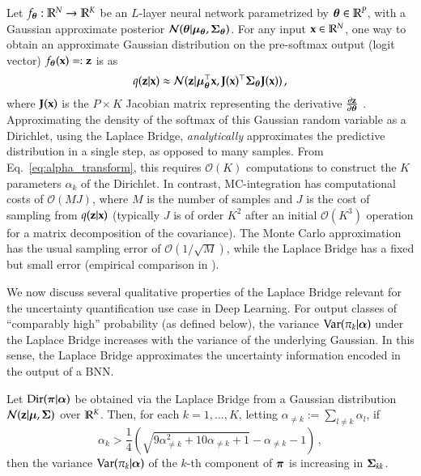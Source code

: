 
Let $f_{\boldsymbol{\theta}}: \mathbb{R}^N \to \mathbb{R}^K$ be an $L$-layer neural network parametrized by ${\boldsymbol{\theta}} \in \mathbb{R}^P$, with a Gaussian approximate posterior $\mathcal{N}({\boldsymbol{\theta}} | {\boldsymbol{\mu}}_{\boldsymbol{\theta}}, {\boldsymbol{\Sigma}}_{\boldsymbol{\theta}})$. For any input $\mathbf{x} \in \mathbb{R}^N$, one way to obtain an approximate Gaussian distribution on the pre-softmax output (logit vector) $f_{\boldsymbol{\theta}}(\mathbf{x}) =: \mathbf{z}$ is as
%
\begin{equation} \label{eq:logit_dist}
    q(\mathbf{z} \vert \mathbf{x}) \approx \mathcal{N}(\mathbf{z} | {\boldsymbol{\mu}}_{\boldsymbol{\theta}}^\top \mathbf{x}, {\mathbf{J}}(\mathbf{x})^\top {\boldsymbol{\Sigma}}_{\boldsymbol{\theta}} {\mathbf{J}}(\mathbf{x})) \, ,
\end{equation}
%
where ${\mathbf{J}}(\mathbf{x})$ is the $P \times K$ Jacobian matrix representing the derivative $\frac{\partial \mathbf{z}}{\partial {\boldsymbol{\theta}}}$ \citep{McKay1995NetworkBayesReview}. Approximating the density of the softmax of this Gaussian random variable as a Dirichlet, using the Laplace Bridge, \emph{analytically} approximates the predictive distribution in a single step, as opposed to many samples. From Eq.~\eqref{eq:alpha_transform}, this requires $\mathcal{O}(K)$ computations to construct the $K$ parameters $\alpha_k$ of the Dirichlet. In contrast, MC-integration has computational costs of $\mathcal{O}(MJ)$, where $M$ is the number of samples and $J$ is the cost of sampling from $q(\mathbf{z} \vert \mathbf{x})$ (typically $J$ is of order $K^2$ after an initial $\mathcal{O}(K^3)$ operation for a matrix decomposition of the covariance). The Monte Carlo approximation has the usual sampling error of $\mathcal{O}(1/\sqrt{M})$, while the Laplace Bridge has a fixed but small error (empirical comparison in ).

We now discuss several qualitative properties of the Laplace Bridge relevant for the uncertainty quantification use case in Deep Learning. For output classes of ``comparably high'' probability (as defined below), the variance $\mathrm{Var}(\pi_k | {\boldsymbol{\alpha}})$ under the Laplace Bridge increases with the variance of the underlying Gaussian. In this sense, the Laplace Bridge approximates the uncertainty information encoded in the output of a BNN.


\begin{proposition} \label{prop:dir_var_from_gaussian}
    Let $\mathrm{Dir}(\boldsymbol{\pi} | {\boldsymbol{\alpha}})$ be obtained via the Laplace Bridge from a Gaussian distribution $\mathcal{N}(\mathbf{z} | {\boldsymbol{\mu}}, {\boldsymbol{\Sigma}})$ over $\mathbb{R}^K$. Then, for each $k = 1, \dots, K$, letting $\alpha_{\neq k} := \sum_{l \neq k} \alpha_l$, if
    \begin{equation*}
        \alpha_k > \frac{1}{4} \left(\sqrt{9\alpha_{\neq k}^2 + 10\alpha_{\neq k} + 1} - \alpha_{\neq k} - 1\right) \, ,
    \end{equation*}
    then the variance $\mathrm{Var}(\pi_k | {\boldsymbol{\alpha}})$ of the $k$-th component of $\boldsymbol{\pi}$ is increasing in ${\boldsymbol{\Sigma}}_{kk}$.
\end{proposition}

